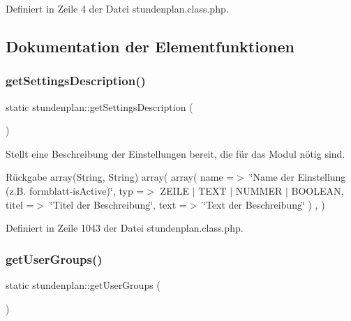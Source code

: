 Definiert in Zeile 4 der Datei stundenplan.\+class.\+php.



\subsection{Dokumentation der Elementfunktionen}
\mbox{\label{classstundenplan_a9e78f27f1c9932e0e2e5e60dc0aa01fb}} 
\subsubsection{\texorpdfstring{get\+Settings\+Description()}{getSettingsDescription()}}
{\footnotesize\ttfamily static stundenplan\+::get\+Settings\+Description (\begin{DoxyParamCaption}{ }\end{DoxyParamCaption})\hspace{0.3cm}{\ttfamily [static]}}

Stellt eine Beschreibung der Einstellungen bereit, die für das Modul nötig sind. \begin{DoxyReturn}{Rückgabe}
array(\+String, String) array( array( \textquotesingle{}name\textquotesingle{} =$>$ \char`\"{}\+Name der Einstellung (z.\+B. formblatt-\/is\+Active)\char`\"{}, \textquotesingle{}typ\textquotesingle{} =$>$ Z\+E\+I\+LE $\vert$ T\+E\+XT $\vert$ N\+U\+M\+M\+ER $\vert$ B\+O\+O\+L\+E\+AN, \textquotesingle{}titel\textquotesingle{} =$>$ \char`\"{}\+Titel der Beschreibung\char`\"{}, \textquotesingle{}text\textquotesingle{} =$>$ \char`\"{}\+Text der Beschreibung\char`\"{} ) , ) 
\end{DoxyReturn}


Definiert in Zeile 1043 der Datei stundenplan.\+class.\+php.

\mbox{\label{classstundenplan_a443935b019eb9ba15cc77d513f4fcac6}} 
\subsubsection{\texorpdfstring{get\+User\+Groups()}{getUserGroups()}}
{\footnotesize\ttfamily static stundenplan\+::get\+User\+Groups (\begin{DoxyParamCaption}{ }\end{DoxyParamCaption})\hspace{0.3cm}{\ttfamily [static]}}

